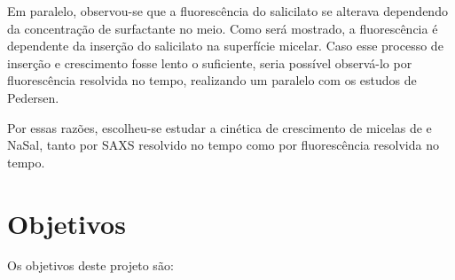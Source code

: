 		Em paralelo, observou-se que a fluorescência do salicilato se alterava dependendo da concentração de surfactante no meio. Como será mostrado, a fluorescência é dependente da inserção do salicilato na superfície micelar. Caso esse processo de inserção e crescimento fosse lento o suficiente, seria possível observá-lo por fluorescência resolvida no tempo, realizando um paralelo com os estudos de Pedersen.
		
		Por essas razões, escolheu-se estudar a cinética de crescimento de micelas de \TTAB{} e NaSal, tanto por SAXS resolvido no tempo como por fluorescência resolvida no tempo.
		
	\chapter{Objetivos}
		Os objetivos deste projeto são:
		
